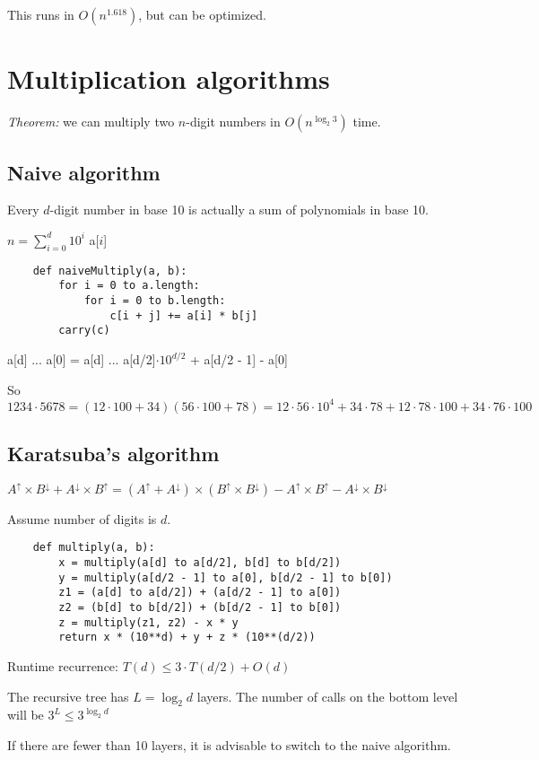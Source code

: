 \documentclass[english,openany]{book}
\begin{document}
    This runs in $O(n^{1.618})$, but can be optimized.

    \newpage

    \section{Multiplication algorithms}

    \textit{Theorem:} we can multiply two $n$-digit numbers in $O(n^{\log_2 3})$ time.

    \subsection{Naive algorithm}

    Every $d$-digit number in base 10 is actually a sum of polynomials in base 10.

    $n = \sum_{i=0}^{d} 10^i$ a[$i$]

    \begin{lstlisting}
    def naiveMultiply(a, b):
        for i = 0 to a.length:
            for i = 0 to b.length:
                c[i + j] += a[i] * b[j]
        carry(c)
    \end{lstlisting}

    a[d] ... a[0] = a[d] ... a[d/2]$ \cdot 10^{d/2}$ + a[d/2 - 1] - a[0]

    So $1234 \cdot 5678 = (12 \cdot 100 + 34)(56 \cdot 100 + 78) = 12 \cdot 56 \cdot 10^4 + 34 \cdot 78 + 12 \cdot 78 \cdot 100 + 34 \cdot 76 \cdot 100$

    \subsection{Karatsuba's algorithm}

    $A^\uparrow \times B^\downarrow + A^\downarrow \times B^\uparrow = (A^\uparrow + A^\downarrow) \times (B^\uparrow \times B^\downarrow) -A^\uparrow \times B^\uparrow - A^\downarrow \times B^\downarrow$

    Assume number of digits is $d$.

    \begin{lstlisting}
    def multiply(a, b):
        x = multiply(a[d] to a[d/2], b[d] to b[d/2])
        y = multiply(a[d/2 - 1] to a[0], b[d/2 - 1] to b[0])
        z1 = (a[d] to a[d/2]) + (a[d/2 - 1] to a[0])
        z2 = (b[d] to b[d/2]) + (b[d/2 - 1] to b[0])
        z = multiply(z1, z2) - x * y
        return x * (10**d) + y + z * (10**(d/2))
    \end{lstlisting}

    Runtime recurrence: $T(d) \leq 3 \cdot T(d/2) + O(d)$

    The recursive tree has $L = \log_2 d$ layers. The number of calls on the bottom level will be $3^L \leq 3^{\log_2 d}$

    If there are fewer than 10 layers, it is advisable to switch to the naive algorithm.
\end{document}
